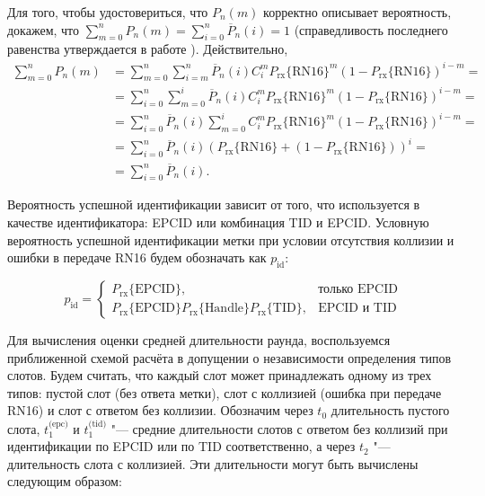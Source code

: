 Для того, чтобы удостовериться, что $P_n(m)$ корректно описывает вероятность, докажем, что $\sum\limits_{m = 0}^n P_n(m) = \sum\limits_{i=0}^n \overline{P}_n(i) = 1$ (справедливость последнего равенства утверждается в работе \cite{Vales-Alonso2011}). Действительно,
$$
\begin{aligned}
	\sum\limits_{m=0}^n P_n(m) &=
		\sum\limits_{m=0}^n \sum\limits_{i=m}^n \overline{P}_n(i) C_i^m
			P_\text{rx}\{\text{RN16}\}^m (1 - P_\text{rx}\{\text{RN16}\})^{i-m} =\\
	&= \sum\limits_{i=0}^n \sum\limits_{m=0}^i \overline{P}_n(i) C_i^m
			P_\text{rx}\{\text{RN16}\}^m (1 - P_\text{rx}\{\text{RN16}\})^{i-m} =\\
	&= \sum\limits_{i=0}^n \overline{P}_n(i) \sum\limits_{m=0}^i C_i^m
			P_\text{rx}\{\text{RN16}\}^m (1 - P_\text{rx}\{\text{RN16}\})^{i-m} =\\
	&= \sum\limits_{i=0}^n \overline{P}_n(i) \left( P_\text{rx}\{\text{RN16}\} + (1 - P_\text{rx}\{\text{RN16}\}) \right)^i =\\
	&= \sum\limits_{i=0}^n \overline{P}_n(i).
\end{aligned}
$$

Вероятность успешной идентификации зависит от того, что используется в качестве идентификатора: EPCID или комбинация TID и EPCID. Условную вероятность успешной идентификации метки при условии отсутствия коллизии и ошибки в передаче RN16 будем обозначать как $p_{\text{id}}$:

\begin{equation}\label{eq:ch3_p_id}
	p_{\text{id}} = \begin{cases}
		P_{\text{rx}}\{\text{EPCID}\}, &\text{только EPCID}\\
		P_{\text{rx}}\{\text{EPCID}\}P_{\text{rx}}\{\text{Handle}\}P_{\text{rx}}\{\text{TID}\},&\text{EPCID и TID}
	\end{cases}
\end{equation}

Для вычисления оценки средней длительности раунда, воспользуемся приближенной схемой расчёта в допущении о независимости определения типов слотов. Будем считать, что каждый слот может принадлежать одному из трех типов: пустой слот (без ответа метки), слот с коллизией (ошибка при передаче RN16) и слот с ответом без коллизии. Обозначим через $t_0$ длительность пустого слота, $t_1^{\text{(epc)}}$ и $t_1^{\text{(tid)}}$  "--- средние длительности слотов с ответом без коллизий при идентификации по EPCID или по TID соответственно, а через $t_2$ "--- длительность слота с коллизией. Эти длительности могут быть вычислены следующим образом:

